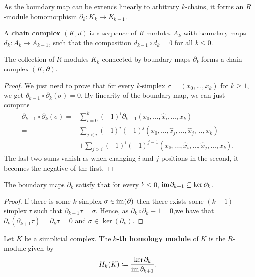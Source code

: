 As the boundary map can be extends linearly to arbitrary $k$-chains, it forms an $R$-module homomorphism $\partial_k \colon K_k \to K_{k-1}$.

\begin{definition}
    A {\bf chain complex} $(K, d)$ is a sequence of $R$-modules $ A_k $ with boundary maps $ d_k \colon A_k \to A_{k-1} $, such that the composition $ d_{k-1} \circ d_k = 0 $ for all $k \leq 0$.
\end{definition}

\begin{lemma}
    The collection of $R$-modules $K_k$ connected by boundary maps $\partial_k$ forms a chain complex $(K, \partial)$.
\end{lemma}
\begin{proof}
    We just need to prove that for every $k$-simplex $\sigma = (x_0, \dots, x_k) $ for $ k \geq 1 $, we get $ \partial_{k-1} \circ \partial_k (\sigma) = 0$. By linearity of the boundary map, we can just compute
    \begin{align}
        \partial_{k-1} \circ \partial_k (\sigma) = & \sum_{i=0}^{k} (-1)^i \partial_{k-1} (x_0, \dots, \hat x_i, \dots, x_k) \\
        = & \sum_{j < i} (-1)^i (-1)^j (x_0, \dots, \hat x_j, \dots, \hat x_j, \dots, x_k) \\
        & + \sum_{j > i} (-1)^i (-1)^{j-1} (x_0, \dots, \hat x_i, \dots, \hat x_j, \dots, x_k).
    \end{align}
    The last two sums vanish as when changing $ i $ and $j $ positions in the second, it becomes the negative of the first.
\end{proof}

\begin{corolary}
    The boundary maps $\partial_k$ satisfy that for every $k \leq 0$, $\operatorname{im} \partial_{k+1} \subseteq \ker \partial_k $.
\end{corolary}
\begin{proof}
    If there is some $k$-simplex $\sigma \in \operatorname{im}(\partial)$ then there exists some $(k+1)$-simplex $\tau$ such that $ \partial_{k+1} \tau = \sigma $. Hence, as $ \partial_k \circ \partial_k+1 = 0 $,we have that $ \partial_k(\partial_{k+1} \tau) = \partial_k \sigma = 0 $ and $ \sigma \in \ker(\partial_k) $.
\end{proof}

\begin{definition}
    Let $K $ be a simplicial complex. The {\bf $k$-th homology module} of $K$ is the $R$-module given by
    \begin{equation}
        H_k(K) \coloneq \frac{\ker \partial_k}{\operatorname{im} \partial_{k+1}}.
    \end{equation} 
\end{definition}

